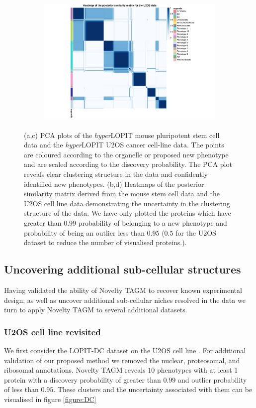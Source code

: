 \documentclass[12pt,english]{article}
\begin{document}
\begin{figure}[ht]
\begin{subfigure}[t]{0.5\textwidth}
	\centering
	\includegraphics[height=2.5in]{heatmapuU2oshl.jpg}
	\caption{}
\end{subfigure}
	\caption{(a,c) PCA plots of the \textit{hyper}LOPIT mouse pluripotent stem cell data and the \textit{hyper}LOPIT U2OS cancer cell-line data. The points are coloured according to the organelle or proposed new phenotype and are scaled according to the discovery probability. The PCA plot reveals clear clustering structure in the data and confidently identified new phenotypes. (b,d) Heatmaps of the posterior similarity matrix derived from the mouse stem cell data and the U2OS cell line data demonstrating the uncertainty in the clustering structure of the data. We have only plotted the proteins which have greater than 0.99 probability of belonging to a new phenotype and probability of being an outlier less than 0.95 ($0.5$ for the U2OS dataset to reduce the number of visualised proteins.).}
	\label{figure:mouse}
\end{figure}
\clearpage
\subsection{Uncovering additional sub-cellular structures}
Having validated the ability of Novelty TAGM to recover known experimental design, as well as uncover additional sub-cellular niches resolved in the data we turn to apply Novelty TAGM to several additional datasets.

\subsubsection{U2OS cell line revisited}
 We first consider the LOPIT-DC dataset on the U2OS cell line \citep{DC:2018}. For additional validation of our proposed method we removed the nuclear, proteosomal, and ribosomal annotations. Novelty TAGM reveals $10$ phenotypes with at least 1 protein with a discovery probability of greater than $0.99$ and outlier probability of less than $0.95$. These clusters and the uncertainty associated with them can be visualised in figure \ref{figure:DC}
\end{document}
